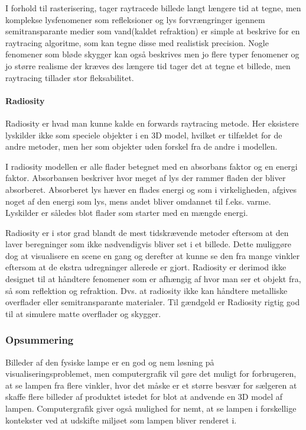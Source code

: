 I forhold til rasterisering, tager raytracede billede langt længere tid at tegne, men komplekse lysfenomener som refleksioner og lys forvrængringer igennem semitransparante medier som vand(kaldet refraktion) er simple at beskrive for en raytracing algoritme, som kan tegne disse med realistisk precision. Nogle fenomener som bløde skygger kan også beskrives men jo flere typer fenomener og jo større realisme der kræves des længere tid tager det at tegne et billede, men raytracing tillader stor fleksabilitet.

\paragraph{Radiosity \cite{radiosity_by_wpi,radiosity_by_uob}}
Radiosity er hvad man kunne kalde en forwards raytracing metode. Her eksistere lyskilder ikke som speciele objekter i en 3D model, hvilket er tilfældet for de andre metoder, men her som objekter uden forskel fra de andre i modellen.

I radiosity modellen er alle flader betegnet med en absorbans faktor og en energi faktor. Absorbansen beskriver hvor meget af lys der rammer fladen der bliver absorberet. Absorberet lys hæver en flades energi og som i virkeligheden, afgives noget af den energi som lys, mens andet bliver omdannet til f.eks. varme. Lyskilder er således blot flader som starter med en mængde energi.

Radiosity er i stor grad blandt de mest tidskrævende metoder eftersom at den laver beregninger som ikke nødvendigvis bliver set i et billede. Dette muliggøre dog at visualisere en scene en gang og derefter at kunne se den fra mange vinkler eftersom at de ekstra udregninger allerede er gjort. Radiosity er derimod ikke designet til at håndtere fenomener som er afhængig af hvor man ser et objekt fra, så som reflektion og refraktion. Dvs. at radiosity ikke kan håndtere metalliske overflader eller semitransparante materialer. Til gændgeld er Radiosity rigtig god til at simulere matte overflader og skygger.

\subsubsection*{Opsummering}
Billeder af den fysiske lampe er en god og nem løsning på visualiseringsproblemet, men computergrafik vil gøre det muligt for forbrugeren, at se lampen fra flere vinkler, hvor det måske er et større besvær for sælgeren at skaffe flere billeder af produktet istedet for blot at andvende en 3D model af lampen. Computergrafik giver også mulighed for nemt, at se lampen i forskellige kontekster ved at udskifte miljøet som lampen bliver renderet i. 

